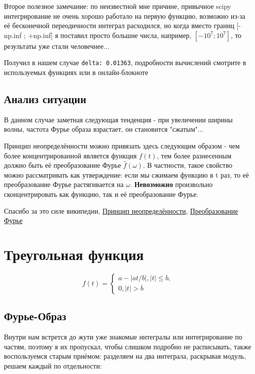Второе полезное замечание: по неизвестной мне причине, привычное scipy интегрирование не очень хорошо работало на первую функцию, возможно из-за её бесконечной переодичности интеграл расходился,
но когда вместо границ [-np.inf ; +np.inf] я поставил просто большие числа, например, $[-10^7 ; 10^7]$, то результаты уже стали человечнее...

Получил в нашем случае \texttt{delta: 0.01363}, подробности вычислений смотрите в используемых функциях или в онлайн-блокноте

\subsection{Анализ ситуации}

В данном случае заметная следующая тенденция - при увеличении ширины волны, частота Фурье образа взрастает, он становится "сжатым"...

Принцип неопределённости можно привязать здесь следующим образом - чем более концентрированной является функция $f(t)$, тем более разнесенным должно быть её  преобразование Фурье $\hat{f}(\omega)$. В частности, такое свойство можно рассматривать как утверждение: если мы сжимаем функцию в t раз, то её преобразование Фурье растягивается на $\omega$.
\textbf{Невозможно} произвольно сконцентрировать как функцию, так и её преобразование Фурье.

Спасибо за это силе википедии, \href{https://en.wikipedia.org/wiki/Uncertainty_principle?useskin=vector}{Принцип неопределённости}, \href{https://en.wikipedia.org/wiki/Fourier_transform?useskin=vector}{Преобразование Фурье}

\section{Треугольная функция}
$$
f(t) = \begin{cases}
    a-|at/b|, |t| \leq b, \\
    0, |t|>b
\end{cases}
$$


\subsection{Фурье-Образ}

Внутри нам встрется до жути уже знакомые интегралы или интегрирование по частям, поэтому я их пропускал, чтобы слишком подробно не расписывать, также воспользуемся старым приёмом: 
разделяем на два интеграла, раскрывая модуль, решаем каждый по отдельности:


